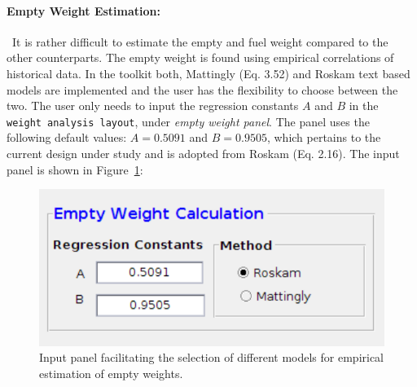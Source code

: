 \documentclass[pdftex,11pt,letter]{article}
\begin{document}
\paragraph{Empty Weight Estimation:}~It is rather difficult to estimate the empty and fuel weight compared to the other counterparts. The empty weight is found using empirical correlations of  historical data. In the toolkit both, Mattingly\cite{MattinglyText} (Eq. 3.52) and Roskam\cite{RoskamText} text based models are implemented and the user has the flexibility to choose between the two. The user only needs to input the regression constants $A$ and $B$ in the \texttt{weight analysis layout}, under \textit{empty weight panel}. The panel uses the following default values: $A=0.5091$ and $B=0.9505$, which pertains to the current design under study and is adopted from Roskam\cite{RoskamText} (Eq. 2.16). The input panel is shown in Figure~\ref{panel_empty_weight}:
 \begin{figure}[h!]
	\centering
	\includegraphics[scale=0.85]{figures/empty_weight_panel.pdf}
	\caption{Input panel facilitating the selection of different models for empirical estimation of empty weights.}
	\label{panel_empty_weight}
\end{figure}
\end{document}
